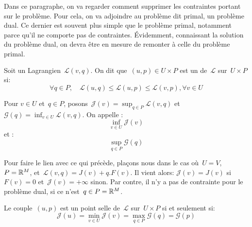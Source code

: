 Dans ce paragraphe, on va regarder comment supprimer les contraintes portant sur le problème. Pour cela, on va adjoindre au problème dit primal, un problème dual. Ce dernier est souvent plus simple que le problème primal, notamment parce qu'il ne comporte pas de contraintes. Évidemment, connaissant la solution du problème dual, on devra être en mesure de remonter à celle du problème primal.

\begin{definition}
Soit un Lagrangien~$\mathscr{L}(v,q)$.
On dit que~$(u,p)\in U\times P$ est un  de~$\mathscr{L}$ sur~$U\times P$ si:
\begin{equation}
\forall q\in P, \quad \mathscr{L}(u,q) \le \mathscr{L}(u,p) \le \mathscr{L}(v,p), \forall v\in U
\end{equation}

Pour $v\in U$ et~$q\in P$, posons~$\mathcal{J}(v)=\sup_{q\in P}\mathscr{L}(v,q)$ et~$\mathcal{G}(q)=\inf_{v\in U}\mathscr{L}(v,q)$.
On appelle :
\begin{equation}
\inf_{v\in U} \mathcal{J}(v)
\end{equation}
et :
\begin{equation}
\sup_{q\in P} \mathcal{G}(q)
\end{equation}
\end{definition}

Pour faire le lien avec ce qui précède, plaçons nous dans le cas où~$U=V$, $P=\mathbb R^M$, et~$\mathscr{L}(v,q)=J(v)+q.F(v)$.
Il vient alors: $\mathcal{J}(v)=J(v)$ si~$F(v)=0$ et~$\mathcal{J}(v)=+\infty$ sinon.
Par contre, il n'y a pas de contrainte pour le problème dual, si ce n'est~$q\in P=\mathbb R^M$.


\begin{theoreme}
Le couple~$(u,p)$ est un point selle de~$\mathscr{L}$ sur~$U\times P$ si et seulement si:
\begin{equation}
\mathcal{J}(u)=\min_{v\in U}\mathcal{J}(v) = \max_{q\in P}\mathcal{G}(q)=\mathcal{G}(p)
\end{equation}
\end{theoreme}


